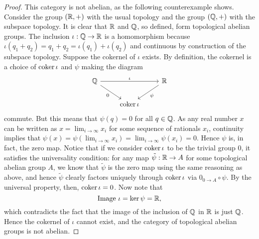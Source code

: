 \documentclass{../../mathnotes}
\begin{document}
\begin{proof}
    This category is not abelian, as the following counterexample shows. Consider the group $(\mathbb{R},+)$
    with the usual topology and the group $(\mathbb{Q},+)$ with the subspace topology. It is clear that
    $\mathbb{R}$ and $\mathbb{Q}$, so defined, form topological abelian groups. The inclusion $\iota:\mathbb{Q}\to\mathbb{R}$
    is a homomorphism because $\iota(q_1+q_2)=q_1+q_2=\iota(q_1)+\iota(q_2)$ and continuous by
    construction of the subspace topology. Suppose the cokernel of $\iota$ exists.
    By definition, the cokernel is a choice of $\operatorname{coker}\iota$ and $\psi$ making the diagram
    \begin{equation*}
        \begin{tikzcd}
            \Q\arrow{rr}{\iota}\arrow[swap]{dr}{0}&&\R\arrow{dl}{\psi}\\
            &\coker\iota&
        \end{tikzcd}
    \end{equation*}
    commute. But this means that $\psi(q)=0$ for all $q\in\mathbb{Q}$. As any real number $x$ can be written as
    $x=\lim_{i\to\infty} x_i$ for some sequence of rationals $x_i$, continuity implies that
    $\psi(x)=\psi(\lim_{i\to\infty} x_i)=\lim_{i\to\infty}\psi(x_i)=0$. Hence $\psi$ is, in fact,
    the zero map. Notice that if we consider $\operatorname{coker}\iota$ to be the trivial group $0$, it satisfies 
    the universality condition: for any map $\tilde\psi:\mathbb{R}\to A$ for some topological abelian group
    $A$, we know that $\tilde\psi$ is the zero map using the same reasoning as above, and hence
    $\tilde\psi$ clearly factors uniquely through $\operatorname{coker}\iota$ via $0_{0\to A}\circ\psi$. By the
    universal property, then, $\operatorname{coker}\iota=0$. Now note that
    \[\text{Image }\iota=\ker\psi=\mathbb{R},\]
    which contradicts the fact that the image of the inclusion of $\mathbb{Q}$ in $\mathbb{R}$ is just $\mathbb{Q}$.
    Hence the cokernel of $\iota$ cannot exist, and the category of topological abelian groups
    is not abelian.
\end{proof}
\end{document}
